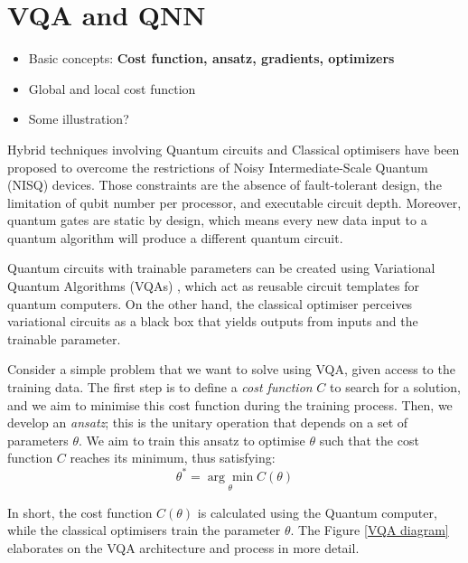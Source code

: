 \section{VQA and QNN}
\begin{itemize}
    \item Basic concepts: \textbf{Cost function, ansatz, gradients, optimizers}
    \item Global and local cost function
    \item Some illustration?
\end{itemize}

Hybrid techniques involving Quantum circuits and Classical optimisers have been proposed to overcome the restrictions of Noisy Intermediate-Scale Quantum (NISQ) \cite{brooksQuantumSupremacyHunt2019} devices. 
Those constraints are the absence of fault-tolerant design, the limitation of qubit number per processor, and executable circuit depth. 
Moreover, quantum gates are static by design, which means every new data input to a quantum algorithm will produce a different quantum circuit.

Quantum circuits with trainable parameters can be created using Variational Quantum Algorithms (VQAs) \cite{cerezo2021variational}, which act as reusable circuit templates for quantum computers.
On the other hand, the classical optimiser perceives variational circuits as a black box that yields outputs from inputs and the trainable parameter.

Consider a simple problem that we want to solve using VQA, given access to the training data.
The first step is to define a \textit{cost function} $C$ to search for a solution, and we aim to minimise this cost function during the training process.
Then, we develop an \textit{ansatz}; this is the unitary operation that depends on a set of parameters $\theta$. We aim to train this ansatz to optimise $\theta$ such that the cost function $C$ reaches its minimum, thus satisfying:
\begin{equation}
    \theta^* = \underset{\theta}{\arg \min} C(\theta)
    \label{optimize theta with ansatz}
\end{equation}

In short, the cost function $C(\theta)$ is calculated using the Quantum computer, while the classical optimisers train the parameter $\theta$. The Figure \ref{VQA diagram} elaborates on the VQA architecture and process in more detail.

